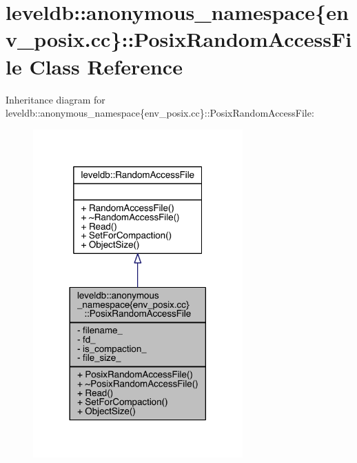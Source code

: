 \hypertarget{classleveldb_1_1anonymous__namespace_02env__posix_8cc_03_1_1_posix_random_access_file}{}\section{leveldb\+:\+:anonymous\+\_\+namespace\{env\+\_\+posix.\+cc\}\+:\+:Posix\+Random\+Access\+File Class Reference}
\label{classleveldb_1_1anonymous__namespace_02env__posix_8cc_03_1_1_posix_random_access_file}


Inheritance diagram for leveldb\+:\+:anonymous\+\_\+namespace\{env\+\_\+posix.\+cc\}\+:\+:Posix\+Random\+Access\+File\+:
\nopagebreak
\begin{figure}[H]
\begin{center}
\leavevmode
\includegraphics[width=228pt]{classleveldb_1_1anonymous__namespace_02env__posix_8cc_03_1_1_posix_random_access_file__inherit__graph}
\end{center}
\end{figure}


